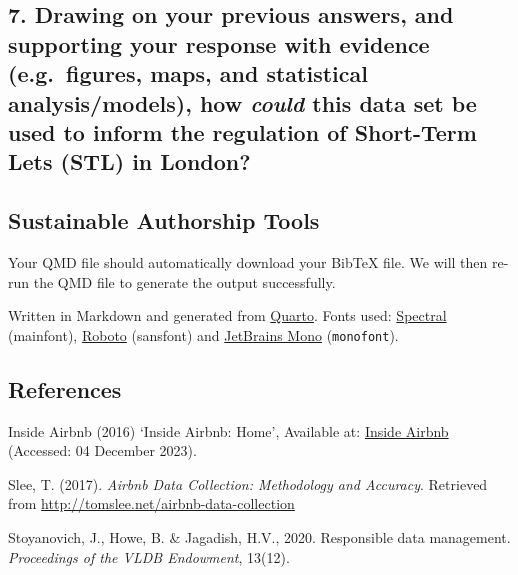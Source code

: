 \documentclass[
  letterpaper,
  DIV=11,
  numbers=noendperiod]{scrartcl}
\begin{document}
\hypertarget{drawing-on-your-previous-answers-and-supporting-your-response-with-evidence-e.g.-figures-maps-and-statistical-analysismodels-how-could-this-data-set-be-used-to-inform-the-regulation-of-short-term-lets-stl-in-london}{%
\subsection{\texorpdfstring{7. Drawing on your previous answers, and
supporting your response with evidence (e.g.~figures, maps, and
statistical analysis/models), how \emph{could} this data set be used to
inform the regulation of Short-Term Lets (STL) in
London?}{7. Drawing on your previous answers, and supporting your response with evidence (e.g.~figures, maps, and statistical analysis/models), how could this data set be used to inform the regulation of Short-Term Lets (STL) in London?}}\label{drawing-on-your-previous-answers-and-supporting-your-response-with-evidence-e.g.-figures-maps-and-statistical-analysismodels-how-could-this-data-set-be-used-to-inform-the-regulation-of-short-term-lets-stl-in-london}}

\hypertarget{sustainable-authorship-tools}{%
\subsection{Sustainable Authorship
Tools}\label{sustainable-authorship-tools}}

Your QMD file should automatically download your BibTeX file. We will
then re-run the QMD file to generate the output successfully.

Written in Markdown and generated from
\href{https://quarto.org/}{Quarto}. Fonts used:
\href{https://fonts.google.com/specimen/Spectral}{Spectral} (mainfont),
\href{https://fonts.google.com/specimen/Roboto}{Roboto} ({sansfont}) and
\href{https://fonts.google.com/specimen/JetBrains\%20Mono}{JetBrains
Mono} (\texttt{monofont}).

\hypertarget{references}{%
\subsection{References}\label{references}}

Inside Airbnb (2016) `Inside Airbnb: Home', Available at:
\href{http://insideairbnb.com/}{Inside Airbnb} (Accessed: 04 December
2023).

Slee, T. (2017). \emph{Airbnb Data Collection: Methodology and
Accuracy}. Retrieved from
\url{http://tomslee.net/airbnb-data-collection}

Stoyanovich, J., Howe, B. \& Jagadish, H.V., 2020. Responsible data
management. \emph{Proceedings of the VLDB Endowment}, 13(12).
\end{document}
